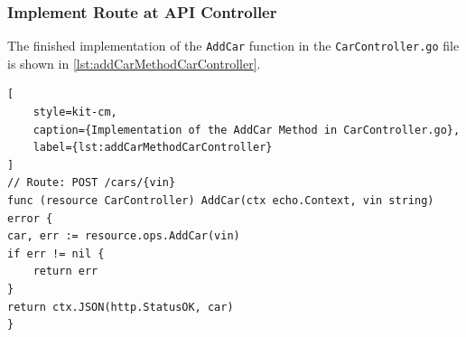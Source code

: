 \subsubsection*{Implement Route at API Controller}
The finished implementation of the \texttt{AddCar} function in the \texttt{CarController.go} file is shown in \autoref{lst:addCarMethodCarController}.


\begin{lstlisting}[
    style=kit-cm,
    caption={Implementation of the AddCar Method in CarController.go},
    label={lst:addCarMethodCarController}
]
// Route: POST /cars/{vin}
func (resource CarController) AddCar(ctx echo.Context, vin string) error {
car, err := resource.ops.AddCar(vin)
if err != nil {
    return err
}
return ctx.JSON(http.StatusOK, car)
}
\end{lstlisting}

